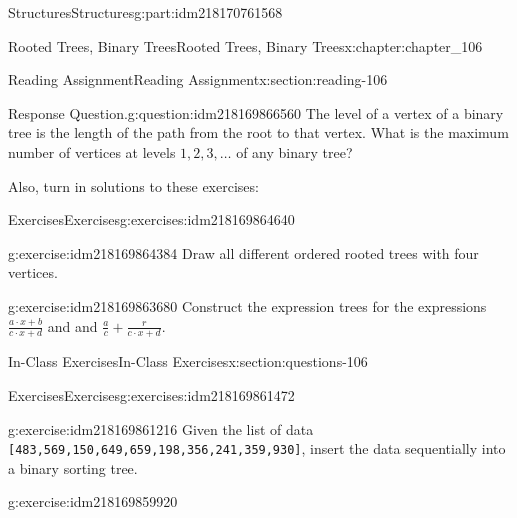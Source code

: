 \documentclass[oneside,10pt,]{book}
\newcommand{\mono}[1]{\texttt{#1}}
\numberwithin{equation}{section}
\begin{document}
\begin{partptx}{Structures}{}{Structures}{}{}{g:part:idm218170761568}
\begin{chapterptx}{Rooted Trees, Binary Trees}{}{Rooted Trees, Binary Trees}{}{}{x:chapter:chapter_106}
\begin{sectionptx}{Reading Assignment}{}{Reading Assignment}{}{}{x:section:reading-106}
\begin{question}{Response Question.}{g:question:idm218169866560}
The level of a vertex of a binary tree is the length of the path from the root to that vertex.  What is the maximum number of vertices at levels \(1, 2, 3, \dots\) of any binary tree?%
\end{question}
Also, turn in solutions to these exercises:%
%
%
\typeout{************************************************}
\typeout{************************************************}
%
\begin{exercises-subsection-numberless}{Exercises}{}{Exercises}{}{}{g:exercises:idm218169864640}
\par\medskip\noindent%
%
\begin{exercisegroup}
\begin{divisionexerciseeg}{1}{}{}{g:exercise:idm218169864384}%
Draw all different ordered rooted trees with four vertices.%
\end{divisionexerciseeg}%
\begin{divisionexerciseeg}{2}{}{}{g:exercise:idm218169863680}%
Construct the expression trees for the expressions \(\frac{a\cdot x + b}{c\cdot x + d}\) and and \(\frac{a}{c}+\frac{r}{c\cdot x + d}\).%
\end{divisionexerciseeg}%
\end{exercisegroup}
\par\medskip\noindent
\end{exercises-subsection-numberless}
\end{sectionptx}
%
%
\typeout{************************************************}
\typeout{************************************************}
%
\begin{sectionptx}{In-Class Exercises}{}{In-Class Exercises}{}{}{x:section:questions-106}
%
%
%
\typeout{************************************************}
\typeout{************************************************}
%
\begin{exercises-subsection-numberless}{Exercises}{}{Exercises}{}{}{g:exercises:idm218169861472}
\par\medskip\noindent%
%
\begin{exercisegroup}
\begin{divisionexerciseeg}{1}{}{}{g:exercise:idm218169861216}%
Given the list of data \mono{[483,569,150,649,659,198,356,241,359,930]}, insert the data sequentially into a binary sorting tree.%
\end{divisionexerciseeg}%
\begin{divisionexerciseeg}{2}{}{}{g:exercise:idm218169859920}%

\end{divisionexerciseeg}
\end{exercisegroup}
\end{exercises-subsection-numberless}
\end{sectionptx}
\end{chapterptx}
\end{partptx}
\end{document}

